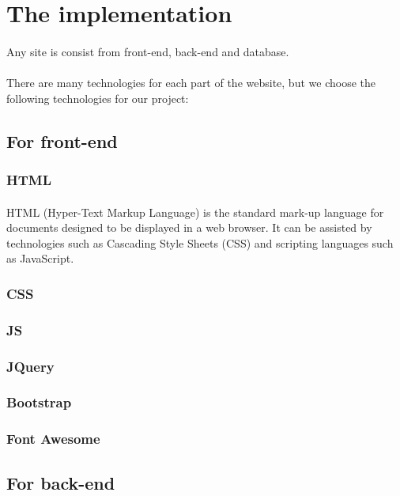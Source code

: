 \documentclass{article}
\begin{document}
	\section{The implementation}
	\paragraph{}
	Any site is consist from front-end, back-end and database.
	\paragraph{}
	There are many technologies for each part of the website, but we choose the following technologies for our project:
	\subsection{For front-end}
	\subsubsection{HTML}
	\paragraph{}
	HTML (Hyper-Text Markup Language) is the standard mark-up language for documents designed to be displayed in a web browser. It can be assisted by technologies such as Cascading Style Sheets (CSS) and scripting languages such as JavaScript.
	\subsubsection{CSS}
	\subsubsection{JS}
	\subsubsection{JQuery}
	\subsubsection{Bootstrap}
	\subsubsection{Font Awesome}
	\subsection{For back-end}
\end{document}
